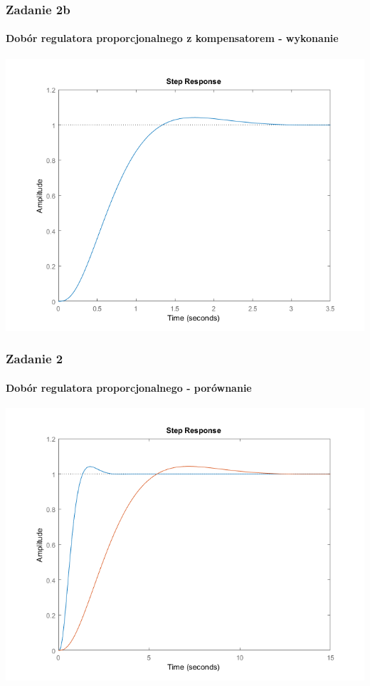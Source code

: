\documentclass{beamer}
\begin{document}
\begin{frame}\frametitle{Zadanie 2b}\framesubtitle{Dobór regulatora proporcjonalnego z kompensatorem - wykonanie}
\centering	\includegraphics[scale=0.5]{b-sys-zamk.png}
\end{frame}

\begin{frame}\frametitle{Zadanie 2}\framesubtitle{Dobór regulatora proporcjonalnego - porównanie}
\centering	\includegraphics[scale=0.5]{step-oba.png}
\end{frame}
\end{document}
